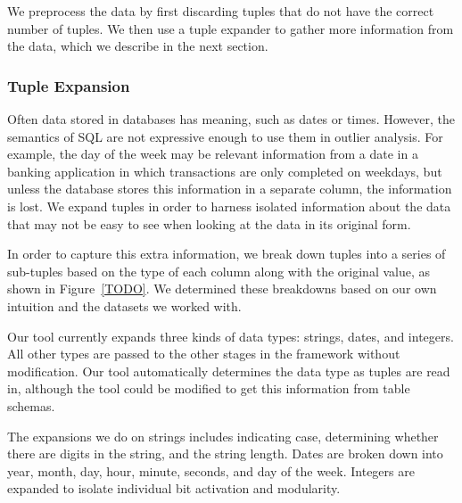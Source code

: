 
We preprocess the data by first discarding tuples that do not have the correct number of tuples.
We then use a tuple expander to gather more information from the data, which we describe in the next section.

\subsubsection{Tuple Expansion}

Often data stored in databases has meaning, such as dates or times.
However, the semantics of SQL are not expressive enough to use them in outlier analysis.
For example, the day of the week may be relevant information from a date in a banking application in which transactions are only completed on weekdays, but unless the database stores this information in a separate column, the information is lost.
We expand tuples in order to harness isolated information about the data that may not be easy to see when looking at the data in its original form.

In order to capture this extra information, we break down tuples into a series of sub-tuples based on the type of each column along with the original value, as shown in Figure~\ref{TODO}.
We determined these breakdowns based on our own intuition and the datasets we worked with.

Our tool currently expands three kinds of data types: strings, dates, and integers.
All other types are passed to the other stages in the framework without modification.
Our tool automatically determines the data type as tuples are read in, although the tool could be modified to get this information from table schemas.

The expansions we do on strings includes indicating case, determining whether there are digits in the string, and the string length.
Dates are broken down into year, month, day, hour, minute, seconds, and day of the week.
Integers are expanded to isolate individual bit activation and modularity.

